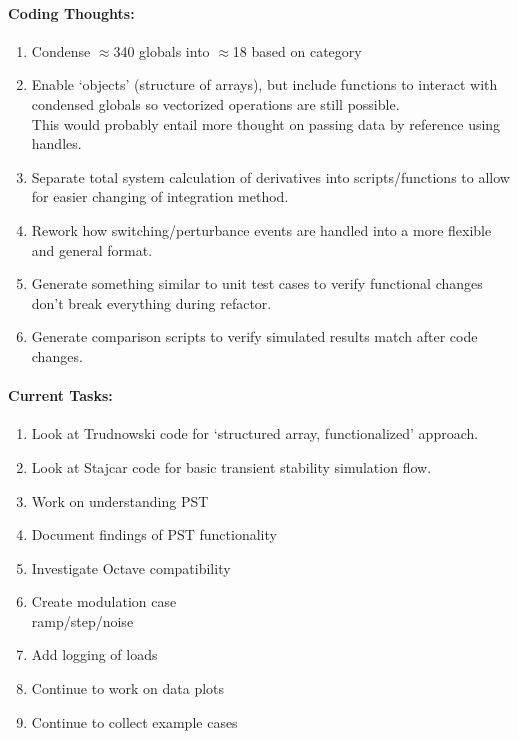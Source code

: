 \documentclass[12pt]{article}
\begin{document}
\begin{multicols}{2}
\paragraph{Coding Thoughts:} 
	\begin{enumerate}
		\item Condense $\approx$340 globals into $\approx$18 based on category
		\item Enable `objects' (structure of arrays), but include functions to interact with condensed globals so vectorized operations are still possible.\\
		This would probably entail more thought on passing data by reference using handles.
		\item Separate total system calculation of derivatives into scripts/functions to allow for easier changing of integration method.
		\item Rework how switching/perturbance events are handled into a more flexible and general format.
		\item Generate something similar to unit test cases to verify functional changes don't break everything during refactor.
		\item Generate comparison scripts to verify simulated results match after code changes.
	\end{enumerate}
	
\vfill\null
\columnbreak
	
\paragraph{Current Tasks:}
	\begin{enumerate}
		\itemsep0em 
		\item Look at Trudnowski code for `structured array, functionalized' approach.
		\item Look at Stajcar code for basic transient stability simulation flow.
		\item Work on understanding PST
		\item Document findings of PST functionality
		\item Investigate Octave compatibility
		\item Create modulation case \\ ramp/step/noise 
		\item Add logging of loads
		\item Continue to work on data plots 
		\item Continue to collect example cases
\end{enumerate}


\end{multicols}
\end{document}
